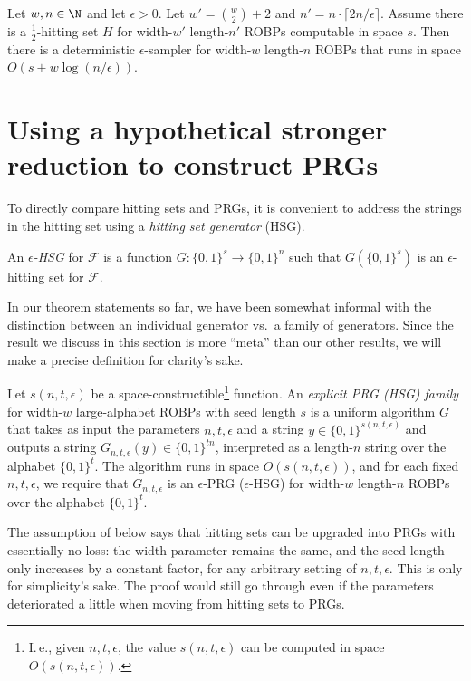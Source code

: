 \documentclass{toc}
\begin{document}
\begin{corollary} \label{cor:const-width-main-generalization}
Let $w, n \in \N$ and let $\epsilon > 0$. Let $w' = \binom{w}{2} + 2$ and $n' = n \cdot \lceil 2n / \epsilon \rceil$. Assume there is a $\frac{1}{2}$-hitting set $H$ for width-$w'$ length-$n'$ ROBPs computable in space $s$. Then there is a deterministic $\epsilon$-sampler for width-$w$ length-$n$ ROBPs that runs in space $O(s + w \log(n/\epsilon))$.
\end{corollary}

\section{Using a hypothetical stronger reduction to construct PRGs} \label{sec:negative}

To directly compare hitting sets and PRGs, it is convenient to address the strings in the hitting set using a \emph{hitting set generator} (HSG).

\begin{definition}
An \emph{$\epsilon$-HSG} for $\mathcal{F}$ is a function $G \colon \{0, 1\}^s \to \{0, 1\}^n$ such that $G(\{0, 1\}^s)$ is an $\epsilon$-hitting set for $\mathcal{F}$.
\end{definition}

In our theorem statements so far, we have been somewhat informal with the distinction between an individual generator vs.\ a family of generators. Since the result we discuss in this section is more ``meta'' than our other results, we will make a precise definition for clarity's sake.

\begin{definition}
Let $s(n, t, \epsilon)$ be a space-constructible\footnote{I.\,e., given $n, t, \epsilon$, the value $s(n, t, \epsilon)$ can be computed in space $O(s(n, t, \epsilon))$.} function. An \emph{explicit PRG (HSG) family} for width-$w$ large-alphabet ROBPs with seed length $s$ is a uniform algorithm $G$ that takes as input the parameters $n, t, \epsilon$ and a string $y \in \{0, 1\}^{s(n, t, \epsilon)}$ and outputs a string $G_{n, t, \epsilon}(y) \in \{0, 1\}^{tn}$, interpreted as a length-$n$ string over the alphabet $\{0, 1\}^t$. The algorithm runs in space $O(s(n, t, \epsilon))$, and for each fixed $n, t, \epsilon$, we require that $G_{n, t, \epsilon}$ is an $\epsilon$-PRG ($\epsilon$-HSG) for width-$w$ length-$n$ ROBPs over the alphabet $\{0, 1\}^t$.
\end{definition}

The assumption of  below says that hitting sets can be upgraded into PRGs with essentially no loss: the width parameter remains the same, and the seed length only increases by a constant factor, for any arbitrary setting of $n, t, \epsilon$. This is only for simplicity's sake. The proof would still go through even if the parameters deteriorated a little when moving from hitting sets to PRGs.
\end{document}
